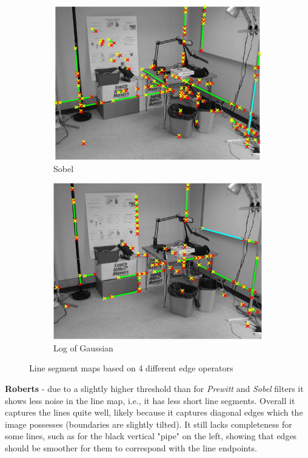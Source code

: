 \documentclass[lettersize,journal]{IEEEtran}
\begin{document}
\begin{figure}[h]
\begin{subfigure}[h]{0.21\textwidth}
        \includegraphics[width=\linewidth]{hough_lines_sobel_0.025}
        \caption{Sobel}  
    \end{subfigure}
    \begin{subfigure}[h]{0.21\textwidth}
        \centering
        \includegraphics[width=\linewidth]{hough_lines_log}
        \caption{Log of Gaussian}  
    \end{subfigure}
    \caption{Line segment maps based on 4 different edge operators}
    \label{fig:9}
\end{figure}

\noindent\textbf{Roberts} - due to a slightly higher threshold than for \emph{Prewitt} and \emph{Sobel} filters it shows less noise in the line map, i.e., it has less short line segments. Overall it captures the lines quite well, likely because it captures diagonal edges which the image possesses (boundaries are slightly tilted). It still lacks completeness for some lines, such as for the black vertical "pipe" on the left, showing that edges should be smoother for them to correspond with the line endpoints.
\end{document}
